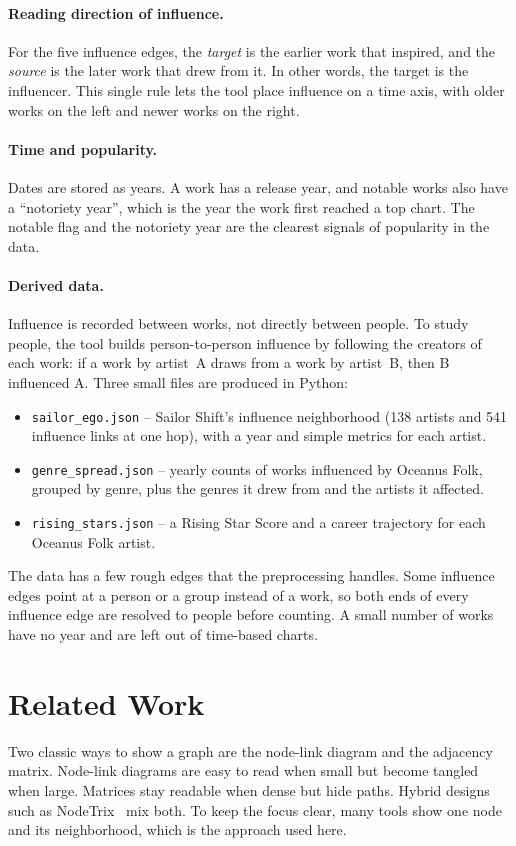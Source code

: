 \documentclass[11pt]{article}
\begin{document}
\paragraph{Reading direction of influence.}
For the five influence edges, the \emph{target} is the earlier work that inspired, and the
\emph{source} is the later work that drew from it. In other words, the target is the
influencer. This single rule lets the tool place influence on a time axis, with older
works on the left and newer works on the right.

\paragraph{Time and popularity.}
Dates are stored as years. A work has a release year, and notable works also have a
``notoriety year'', which is the year the work first reached a top chart. The notable flag
and the notoriety year are the clearest signals of popularity in the data.

\paragraph{Derived data.}
Influence is recorded between works, not directly between people. To study people, the
tool builds person-to-person influence by following the creators of each work: if a work
by artist~A draws from a work by artist~B, then B influenced A. Three small files are
produced in Python:
\begin{itemize}[noitemsep]
  \item \texttt{sailor\_ego.json} -- Sailor Shift's influence neighborhood (138 artists and
        541 influence links at one hop), with a year and simple metrics for each artist.
  \item \texttt{genre\_spread.json} -- yearly counts of works influenced by Oceanus Folk,
        grouped by genre, plus the genres it drew from and the artists it affected.
  \item \texttt{rising\_stars.json} -- a Rising Star Score and a career trajectory for each
        Oceanus Folk artist.
\end{itemize}

The data has a few rough edges that the preprocessing handles. Some influence edges point
at a person or a group instead of a work, so both ends of every influence edge are
resolved to people before counting. A small number of works have no year and are left out
of time-based charts.

\section{Related Work}
Two classic ways to show a graph are the node-link diagram and the adjacency matrix.
Node-link diagrams are easy to read when small but become tangled when large. Matrices
stay readable when dense but hide paths. Hybrid designs such as NodeTrix~\cite{nodetrix}
mix both. To keep the focus clear, many tools show one node and its neighborhood, which is
the approach used here.
\end{document}
